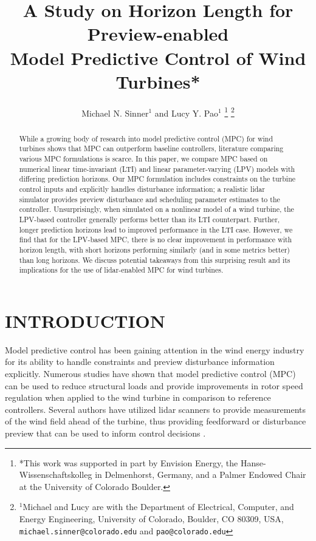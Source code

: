 \documentclass[letterpaper, 10 pt, conference]{ieeeconf}  %
\title{\LARGE \bf A Study on Horizon Length for Preview-enabled \\ Model Predictive Control of Wind Turbines*
}
\author{Michael N. Sinner$^{1}$ and Lucy Y. Pao$^{1}$%
	\thanks{*This work was supported in part by Envision Energy, the Hanse-Wissenschaftskolleg in Delmenhorst, Germany, and a Palmer Endowed Chair at the University of Colorado Boulder.}%
	\thanks{$^{1}$Michael and Lucy are with the Department of Electrical, Computer, and Energy Engineering,
		University of Colorado, Boulder, CO 80309, USA,
		{\tt\small michael.sinner@colorado.edu} and {\tt\small pao@colorado.edu}}}
\begin{document}
		
\maketitle
\thispagestyle{empty}
\pagestyle{empty}

\begin{abstract}

While a growing body of research into model predictive control (MPC) for wind turbines shows that MPC can outperform baseline controllers, literature comparing various MPC formulations is scarce. In this paper, we compare MPC based on numerical linear time-invariant (LTI) and linear parameter-varying (LPV) models with differing prediction horizons. Our MPC formulation includes constraints on the turbine control inputs and explicitly handles disturbance information; a realistic lidar simulator provides preview disturbance and scheduling parameter estimates to the controller. Unsurprisingly, when simulated on a nonlinear model of a wind turbine, the LPV-based controller generally performs better than its LTI counterpart. Further, longer prediction horizons lead to improved performance in the LTI case. However, we find that for the LPV-based MPC, there is no clear improvement in performance with horizon length, with short horizons performing similarly (and in some metrics better) than long horizons. We discuss potential takeaways from this surprising result and its implications for the use of lidar-enabled MPC for wind turbines. 

\end{abstract}


\section{INTRODUCTION}\label{sec:Intro}

Model predictive control has been gaining attention in the wind energy industry for its ability to handle constraints and preview disturbance information explicitly. Numerous studies  have shown that model predictive control (MPC) can be used to reduce structural loads \cite{Bottasso2014}\cite{Tofighi2015} and provide improvements in rotor speed regulation \cite{Laks2012}\cite{Schlipf2013}\cite{Lio2017} when applied to the wind turbine in comparison to reference controllers. Several authors \cite{Bottasso2014}\cite{Gros2017}\cite{Koerber2013}\cite{Raach2014} have utilized lidar scanners to provide measurements of the wind field ahead of the turbine, thus providing feedforward or disturbance preview that can be used to inform control decisions \cite{Schlipf_lidar2015}.
\end{document}
